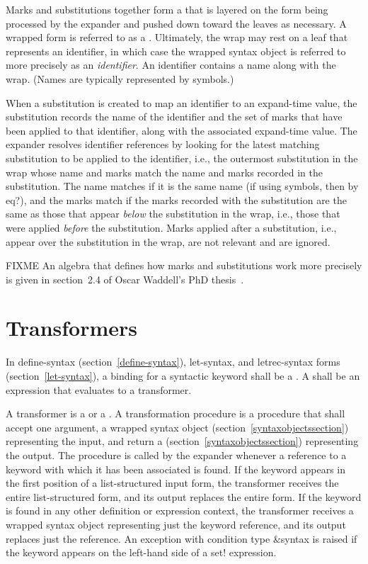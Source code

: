 Marks and substitutions together form a  that is layered on the
form being processed by the expander and pushed down toward the leaves as
necessary.
A wrapped form is referred to as a .
Ultimately, the wrap may rest on a leaf that represents an identifier, in
which case the wrapped syntax object is referred to more precisely
as an \emph{identifier}.
An identifier contains a name along with the wrap.
(Names are typically represented by symbols.)

When a substitution is created to map an identifier to an expand-time
value, the substitution records the name of the identifier and
the set of marks that have been applied to that identifier, along
with the associated expand-time value.
The expander resolves identifier references by looking for the latest
matching substitution to be applied to the identifier, i.e., the outermost
substitution in the wrap whose name and marks match the name and
marks recorded in the substitution.
The name matches if it is the same name (if using symbols, then by
{\cf eq?}), and the marks match if the marks recorded with the
substitution are the same as those that appear \emph{below} the
substitution in the wrap, i.e., those that were applied \emph{before} the
substitution.
Marks applied after a substitution, i.e., appear over the substitution in
the wrap, are not relevant and are ignored.

FIXME
An algebra that defines how marks and substitutions work more precisely is
given in section~2.4 of Oscar Waddell's PhD thesis~\cite{Waddellphd}.

\section{Transformers}
\label{transformerssection}

In {\cf define-syntax} (section~\ref{define-syntax}), {\cf
  let-syntax}, and {\cf letrec-syntax} forms
(section~\ref{let-syntax}), a binding for a syntactic keyword shall be
a .  A  shall be an
expression that evaluates to a transformer.

A transformer is a  or a
.
A transformation procedure is a procedure that shall accept one
argument, a wrapped syntax object (section~\ref{syntaxobjectssection})
representing the input, and return a 
(section~\ref{syntaxobjectssection}) representing the output.
The procedure is called by the expander whenever a reference to
a keyword with which it has been associated is found.
If the keyword appears in the first position of a list-structured
input form, the transformer receives the entire list-structured
form, and its output replaces the entire form.
If the keyword is found in any other definition or expression context, the
transformer receives a wrapped syntax object representing just the keyword
reference, and its output replaces just the reference.
An exception with condition type {\cf\&syntax} is raised if the keyword appears on the
left-hand side of a {\cf set!} expression.

